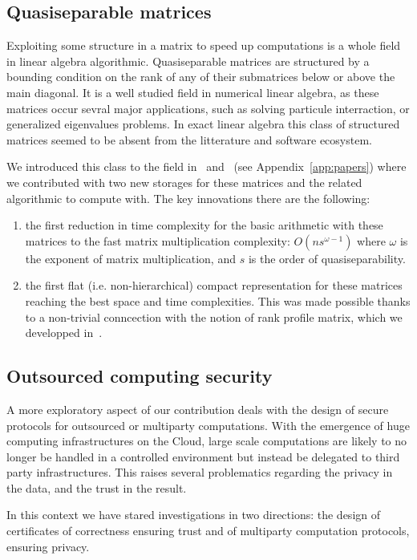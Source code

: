 \documentclass{deliverablereport}
\begin{document}
\subsection{Quasiseparable matrices}

Exploiting some structure in a matrix to speed up computations is a whole field
in linear algebra algorithmic. Quasiseparable matrices are  structured by a
bounding condition on the rank of any of their submatrices below or above
the main diagonal. It is a well studied field in numerical linear algebra, as
these matrices occur sevral major applications, such as solving particule
interraction, or generalized eigenvalues problems.
In exact linear algebra this class of structured matrices seemed to be absent
from the litterature and software ecosystem.

We introduced this class to the field in~\cite{Per16} and~\cite{PeSt18} (see Appendix~\ref{app:papers}) where we
contributed with two new storages for these matrices and the related algorithmic
to compute with. The key innovations there are the following:
\begin{enumerate}
\item the first reduction in time complexity for the basic arithmetic with these
  matrices to the fast matrix multiplication complexity: $O(ns^{\omega-1})$
  where $\omega$ is the exponent of matrix multiplication, and $s$ is the order
  of quasiseparability.
\item the first flat (i.e. non-hierarchical) compact representation for these
  matrices reaching the best space and time complexities. This was made possible
  thanks to a non-trivial conncection with the notion of rank profile matrix,
  which we developped in~\cite{DPS17}.
\end{enumerate}


\subsection{Outsourced computing security}

A more exploratory aspect of our contribution deals with the design of secure
protocols for outsourced or multiparty computations.
With the emergence of huge computing infrastructures on the Cloud, large scale
computations are likely to no longer be handled in a controlled environment but
instead be delegated to third party infrastructures. This raises several
problematics regarding the privacy in the data, and the trust in the result.

In this context we have stared investigations in two directions: the design of
certificates of correctness ensuring trust and of multiparty computation
protocols, ensuring privacy.
\end{document}

